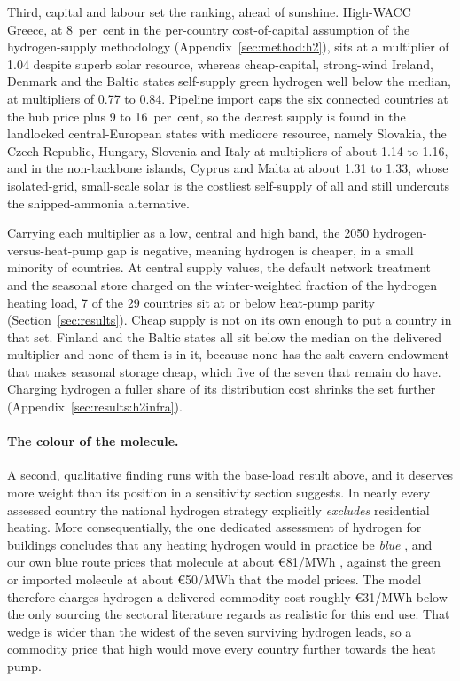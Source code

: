 Third, capital and labour set the ranking, ahead of sunshine. High-WACC Greece, at
8~per~cent in the per-country cost-of-capital assumption of the hydrogen-supply
methodology (Appendix~\ref{sec:method:h2}), sits at a multiplier of 1.04 despite superb
solar resource, whereas cheap-capital, strong-wind Ireland, Denmark and the Baltic
states self-supply green hydrogen well below the median, at multipliers of 0.77 to 0.84.
Pipeline import caps the six connected countries at the hub price plus 9 to 16~per~cent, so
the dearest supply is found in the landlocked central-European states with mediocre
resource, namely Slovakia, the Czech Republic, Hungary, Slovenia and Italy at
multipliers of about 1.14 to 1.16, and in the non-backbone islands, Cyprus and Malta at
about 1.31 to 1.33, whose isolated-grid, small-scale solar is the costliest
self-supply of all and still undercuts the shipped-ammonia alternative.

Carrying each multiplier as a low, central and high band, the 2050
hydrogen-versus-heat-pump gap is negative, meaning hydrogen is cheaper, in a small
minority of countries. At central supply values, the default network treatment and
the seasonal store charged on the winter-weighted fraction of the hydrogen heating
load, 7 of the 29 countries sit at or below heat-pump parity
(Section~\ref{sec:results}). Cheap supply is not on its own enough to put a country
in that set. Finland and the Baltic states all sit below the median on the delivered
multiplier and none of them is in it, because none has the salt-cavern endowment
that makes seasonal storage cheap, which five of the seven that remain do have. Charging hydrogen
a fuller share of its distribution cost shrinks the set further
(Appendix~\ref{sec:results:h2infra}).

\paragraph{The colour of the molecule.} A second, qualitative finding runs with the
base-load result above, and it deserves more weight than its position in a sensitivity
section suggests. In nearly every assessed country the national hydrogen strategy
explicitly \emph{excludes} residential heating. More consequentially, the one dedicated assessment of hydrogen for buildings concludes that any heating hydrogen would in practice be \emph{blue} \citep{Dickel2024ET29}, and our own blue route prices that molecule at about \euro{}81/MWh \citep{IEAGHG2022blue}, against the green or imported molecule at about \euro{}50/MWh that the model prices. The model therefore
charges hydrogen a delivered commodity cost roughly \euro{}31/MWh below the only
sourcing the sectoral literature regards as realistic for this end use. That wedge is
wider than the widest of the seven surviving hydrogen leads, so a commodity price that
high would move every country further towards the heat pump.

